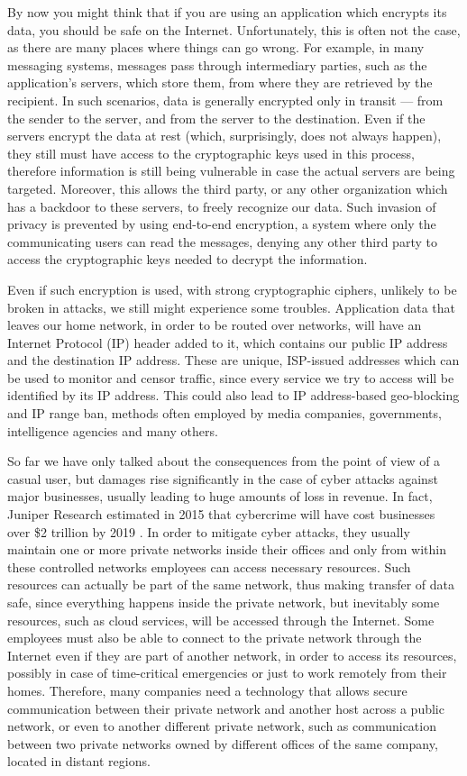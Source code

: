 \documentclass[a4paper,12pt]{report}
\begin{document}
		By now you might think that if you are using an application which encrypts its data, you should be safe on the Internet. Unfortunately, this is often not the case, as there are many places where things can go wrong. For example, in many messaging systems, messages pass through intermediary parties, such as the application's servers, which store them, from where they are retrieved by the recipient. In such scenarios, data is generally encrypted only in transit --- from the sender to the server, and from the server to the destination. Even if the servers encrypt the data at rest (which, surprisingly, does not always happen), they still must have access to the cryptographic keys used in this process, therefore information is still being vulnerable in case the actual servers are being targeted. Moreover, this allows the third party, or any other organization which has a backdoor to these servers, to freely recognize our data. Such invasion of privacy is prevented by using end-to-end encryption, a system where only the communicating users can read the messages, denying any other third party to access the cryptographic keys needed to decrypt the information.
		
		Even if such encryption is used, with strong cryptographic ciphers, unlikely to be broken in attacks, we still might experience some troubles. Application data that leaves our home network, in order to be routed over networks, will have an Internet Protocol (IP) header added to it, which contains our public IP address and the destination IP address. These are unique, ISP-issued addresses which can be used to monitor and censor traffic, since every service we try to access will be identified by its IP address. This could also lead to IP address-based geo-blocking and IP range ban, methods often employed by media companies, governments, intelligence agencies and many others.
		
		So far we have only talked about the consequences from the point of view of a casual user, but damages rise significantly in the case of cyber attacks against major businesses, usually leading to huge amounts of loss in revenue. In fact, Juniper Research estimated in 2015 that cybercrime will have cost businesses over \$2 trillion by 2019 \cite{smith2015cybercrime}. In order to mitigate cyber attacks, they usually maintain one or more private networks inside their offices and only from within these controlled networks employees can access necessary resources. Such resources can actually be part of the same network, thus making transfer of data safe, since everything happens inside the private network, but inevitably some resources, such as cloud services, will be accessed through the Internet. Some employees must also be able to connect to the private network through the Internet even if they are part of another network, in order to access its resources, possibly in case of time-critical emergencies or just to work remotely from their homes. Therefore, many companies need a technology that allows secure communication between their private network and another host across a public network, or even to another different private network, such as communication between two private networks owned by different offices of the same company, located in distant regions.
		
\end{document}
